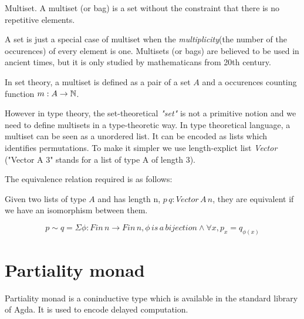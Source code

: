 \begin{definition}

Multiset. A multiset (or bag) is a set without the constraint that there is no repetitive elements.

\end{definition}

A set is just a special case of multiset when the
\emph{multiplicity}(the number of the occurences) of every element is one.
Multisets (or bags) are believed to be used in ancient times, but it
is only 
studied by mathematicans from 20th century.

In set theory, a multiset is defined as a pair of a set $A$ and a
occurences counting function $m : A \rightarrow \mathbb{N}$.

However in type theory, the set-theoretical \emph{"set"} is not a
primitive notion and we need to define multisets in a type-theoretic
way. 
In type theoretical language, a multiset can be seen as a unordered
list. It can be encoded as lists which identifies
permutations. To make it simpler we use length-explict list
\emph{Vector} ("Vector A 3" stands for a list of type A of length 3).


The equivalence relation required is as follows:

Given two lists of type $A$ and has length n, $p \, q : Vector\,A\,n$,
they are equivalent if we have an isomorphism between them.

$$ p \sim q = \Sigma \phi : Fin\,n \rightarrow Fin\,n, \phi\,is\,a\,
bijection \wedge \forall x, p_x = q_{\phi(x)}$$



\section{Partiality monad}

Partiality monad is a coninductive type which is available in the
standard library of Agda. It is used to encode delayed computation.

\begin{code}
\\
\>  \AgdaSymbol{(} \AgdaSymbol{:} \AgdaSymbol{)} \AgdaSymbol{:}  \<%
\\
\>[0]\<[2]%
\>[2] \AgdaSymbol{:}    \<%
\\
\>[0]\<[2]%
\>[2] \AgdaSymbol{:}  \AgdaSymbol{(} \AgdaSymbol{)}   \<%
\\
\end{code}

